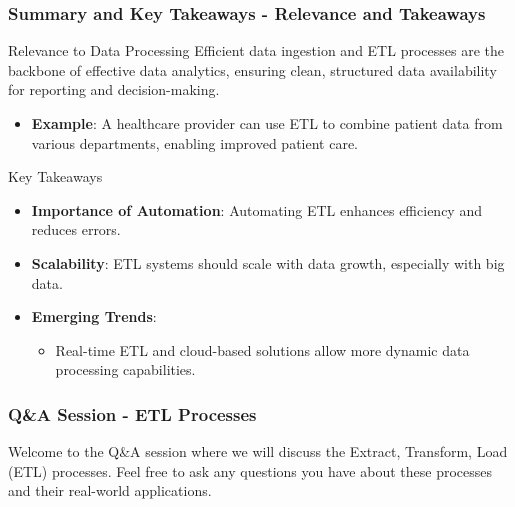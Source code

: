 \documentclass[aspectratio=169]{beamer}
\begin{document}
\begin{frame}[fragile]
    \frametitle{Summary and Key Takeaways - Relevance and Takeaways}
    \begin{block}{Relevance to Data Processing}
        Efficient data ingestion and ETL processes are the backbone of effective data analytics, ensuring clean, structured data availability for reporting and decision-making.
        \begin{itemize}
            \item \textbf{Example}: A healthcare provider can use ETL to combine patient data from various departments, enabling improved patient care.
        \end{itemize}
    \end{block}
    
    \begin{block}{Key Takeaways}
        \begin{itemize}
            \item \textbf{Importance of Automation}: Automating ETL enhances efficiency and reduces errors.
            \item \textbf{Scalability}: ETL systems should scale with data growth, especially with big data.
            \item \textbf{Emerging Trends}:
                \begin{itemize}
                    \item Real-time ETL and cloud-based solutions allow more dynamic data processing capabilities.
                \end{itemize}
        \end{itemize}
    \end{block}
\end{frame}

\begin{frame}[fragile]
    \frametitle{Q\&A Session - ETL Processes}
    Welcome to the Q\&A session where we will discuss the Extract, Transform, Load (ETL) processes. Feel free to ask any questions you have about these processes and their real-world applications.
\end{frame}
\end{document}
